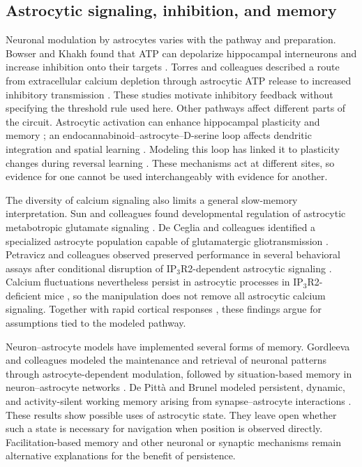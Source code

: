 \subsection{Astrocytic signaling, inhibition, and memory}
Neuronal modulation by astrocytes varies with the pathway and preparation. Bowser and Khakh found that ATP can depolarize hippocampal interneurons and increase inhibition onto their targets \cite{bowser2004atp}. Torres and colleagues described a route from extracellular calcium depletion through astrocytic ATP release to increased inhibitory transmission \cite{torres2012extracellular}. These studies motivate inhibitory feedback without specifying the threshold rule used here. Other pathways affect different parts of the circuit. Astrocytic activation can enhance hippocampal plasticity and memory \cite{adamsky2018astrocytic}; an endocannabinoid--astrocyte--D-serine loop affects dendritic integration and spatial learning \cite{bohmbach2022astrocytic}. Modeling this loop has linked it to plasticity changes during reversal learning \cite{squadrani2024reversal}. These mechanisms act at different sites, so evidence for one cannot be used interchangeably with evidence for another.

The diversity of calcium signaling also limits a general slow-memory interpretation. Sun and colleagues found developmental regulation of astrocytic metabotropic glutamate signaling \cite{sun2013glutamate}. De Ceglia and colleagues identified a specialized astrocyte population capable of glutamatergic gliotransmission \cite{deceglia2023specialized}. Petravicz and colleagues observed preserved performance in several behavioral assays after conditional disruption of IP$_3$R2-dependent astrocytic signaling \cite{petravicz2014astrocyte}. Calcium fluctuations nevertheless persist in astrocytic processes in IP$_3$R2-deficient mice \cite{srinivasan2015calcium}, so the manipulation does not remove all astrocytic calcium signaling. Together with rapid cortical responses \cite{stobart2018cortical}, these findings argue for assumptions tied to the modeled pathway.

Neuron--astrocyte models have implemented several forms of memory. Gordleeva and colleagues modeled the maintenance and retrieval of neuronal patterns through astrocyte-dependent modulation, followed by situation-based memory in neuron--astrocyte networks \cite{gordleeva2021working,gordleeva2025situation}. De Pitt\`a and Brunel modeled persistent, dynamic, and activity-silent working memory arising from synapse--astrocyte interactions \cite{depitta2022multiple}. These results show possible uses of astrocytic state. They leave open whether such a state is necessary for navigation when position is observed directly. Facilitation-based memory \cite{mongillo2008synaptic} and other neuronal or synaptic mechanisms remain alternative explanations for the benefit of persistence.

